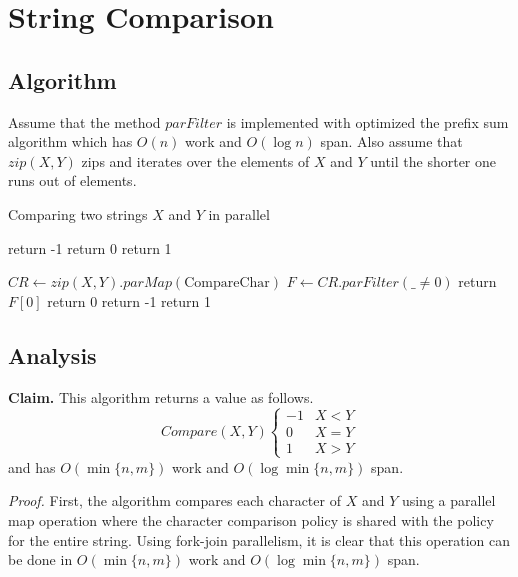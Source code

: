 \chapter{String Comparison}

\section{Algorithm}

Assume that the method $parFilter$ is implemented with optimized the prefix sum algorithm which has $O(n)$ work and $O(\log n)$ span. Also assume that $zip(X, Y)$ zips and iterates over the elements of $X$ and $Y$  until the shorter one runs out of elements.

\begin{algorithm}
\caption{Comparing two strings $X$ and $Y$ in parallel}
\begin{algorithmic}[1]

		\State return -1
		\State return 0
	\Else
		\State return 1
	\EndIf
\EndProcedure

\State  

	\State $CR \gets zip(X, Y).parMap(\text{CompareChar})$
	\State $F \gets CR.parFilter(\_ \neq 0)$
	\State 
		\State return $F[0]$
	\EndIf
		\State return 0
		\State return -1
	\Else 
		\State return 1
	\EndIf
\EndProcedure

\end{algorithmic}
\end{algorithm}

\section{Analysis}

\textbf{Claim.} This algorithm returns a value as follows.
\[
	Compare(X, Y) \begin{cases}
		-1 & X < Y \\
		0 & X = Y \\
		1 & X > Y
	\end{cases}
\]
and has $O(\min\{n, m\})$ work and $O(\log \min\{n, m\})$ span.

\textit{Proof.} First, the algorithm compares each character of $X$ and $Y$ using a parallel map operation where the character comparison policy is shared with the policy for the entire string. Using fork-join parallelism, it is clear that this operation can be done in $O(\min\{n, m\})$ work and $O(\log\min\{n, m\})$ span. 

